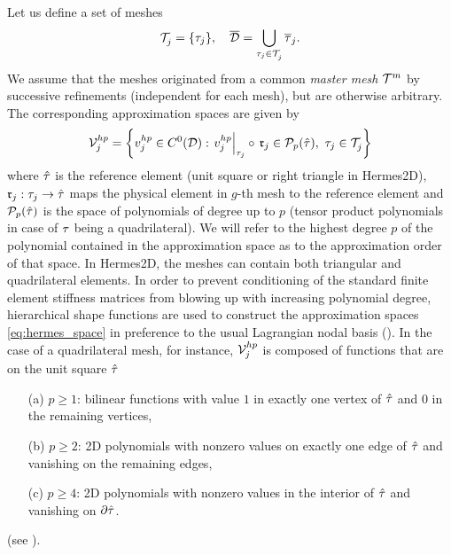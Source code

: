 Let us define a set of meshes 
$$ \meshgen{j} = \{\elem_j\},\quad
	\overline{\VV} = \bigcup_{\elem_j\in\meshgen{j}} \overline\elem_j.
$$
We assume that the meshes originated from a common \textit{master mesh} $\meshgen[m]{}$ by successive refinements
(independent for each mesh), but are otherwise arbitrary. The corresponding approximation
spaces are given by
\begin{equation}\label{eq:hermes_space}
	\Space^{hp}_j = \left\{v^{hp}_j \in C^0(\VV): \left. v^{hp}_j\right\vert_{\elem_j} \circ\, \mathfrak{r}_j \in
	\mathcal{P}_{p}(\hat{\elem}),\ \elem_j\in\meshgen{j}
	\right\}
\end{equation}
where $\hat{\elem}$ is the reference element (unit square or right triangle in Hermes2D), $\mathfrak{r}_j :
\elem_j \to \hat{\elem} $ maps the physical element in $g$-th mesh to the reference element and
$\mathcal{P}_{p}(\hat{\elem})$ is the space of polynomials of degree up to $p$ (tensor product polynomials in case of
$\elem$ being a quadrilateral). We will refer to the highest degree $p$ of the polynomial contained in the approximation
space as to the approximation order of that space. In Hermes2D, the meshes can contain both
triangular and quadrilateral elements. In order to prevent conditioning of the standard finite element stiffness matrices from blowing up with
increasing polynomial degree, hierarchical shape functions are used to construct the approximation spaces \eqref{eq:hermes_space} in
preference to the usual Lagrangian nodal basis (\cite[Sec. 2.5.3]{Hermes-book2}). In the case of a quadrilateral
mesh, for instance, $\Space^{hp}_j$ is composed of functions that are on the unit square $\hat\elem$
\begin{enumerate}
	\item[(a)] $p \geq 1$: bilinear functions with value $1$ in exactly one vertex of $\hat\elem$ and $0$
	in the remaining vertices,
	\item[(b)] $p \geq 2$: 2D polynomials with nonzero values on exactly one edge of $\hat\elem$ and vanishing on the
	remaining edges,
	\item[(c)] $p \geq 4$: 2D polynomials with nonzero values in the interior of $\hat\elem$ and vanishing on
	$\partial \hat\elem$.
\end{enumerate}
(see ).

